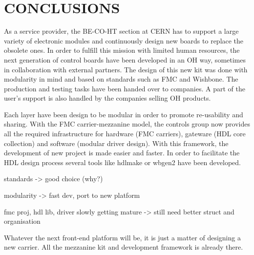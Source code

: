 \documentclass{JAC2003}
\begin{document}
\section{CONCLUSIONS}
As a service provider, the BE-CO-HT section at CERN has to support a large variety of electronic modules and continuously design new boards to replace the obsolete ones.
In order to fulfill this mission with limited human resources, the next generation of control boards have been developed in an OH way, sometimes in collaboration with external partners.
The design of this new kit was done with modularity in mind and based on standards such as FMC and Wishbone.
The production and testing tasks have been handed over to companies.
A part of the user's support is also handled by the companies selling OH products.

Each layer have been design to be modular in order to promote re-usability and sharing.
With the FMC carrier-mezzanine model, the controls group now provides all the required infrastructure for hardware (FMC carriers), gateware (HDL core collection) and software (modular driver design). With this framework, the development of new project is made easier and faster.
In order to facilitate the HDL design process several tools like hdlmake or wbgen2 have been developed.

standards -> good choice (why?)

modularity -> fast dev, port to new platform

fmc proj, hdl lib, driver slowly getting mature -> still need better struct and organisation

Whatever the next front-end platform will be, it is just a matter of designing a new carrier. All the mezzanine kit and development framework is already there.
\end{document}
